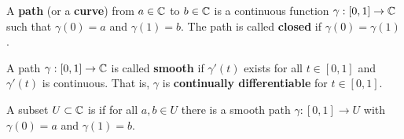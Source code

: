 \begin{definition}[Path]
    A \textbf{path} (or a \textbf{curve}) from $a \in \mathbb{C}$ to $b \in \mathbb{C}$ is a continuous function $\gamma: [0, 1] \to \mathbb{C}$ such that $\gamma(0) = a$ and $\gamma(1) = b$. The path is called \textbf{closed} if $\gamma(0) = \gamma(1)$.
\end{definition}

\begin{definition}[Smooth]
    A path $\gamma: [0, 1] \to \mathbb{C}$ is called \textbf{smooth} if $\gamma'(t)$ exists for all $t \in [0, 1]$ and $\gamma'(t)$ is continuous. That is, $\gamma$ is \textbf{continually differentiable} for $t \in [0, 1]$.
\end{definition}

\begin{definition}
    A subset $U \subset \mathbb{C}$ is  if for all $a, b \in U$ there is a smooth path $\gamma: [0, 1] \to U$ with $\gamma(0) = a$ and $\gamma(1) = b$. 
\end{definition}
